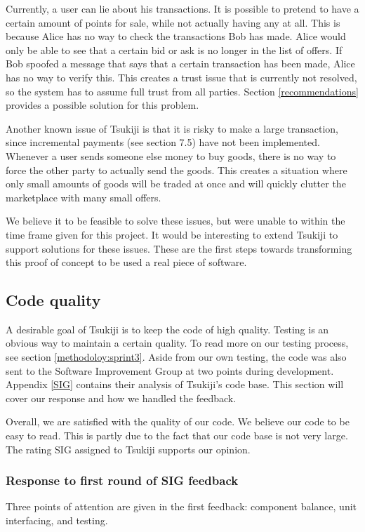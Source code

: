 Currently, a user can lie about his transactions.
It is possible to pretend to have a certain amount of points for sale, while not actually having any at all.
This is because Alice has no way to check the transactions Bob has made.
Alice would only be able to see that a certain bid or ask is no longer in the list of offers.
If Bob spoofed a message that says that a certain transaction has been made, Alice has no way to verify this.
This creates a trust issue that is currently not resolved, so the system has to assume full trust from all parties.
Section \ref{recommendations} provides a possible solution for this problem.

Another known issue of Tsukiji is that it is risky to make a large transaction, since incremental payments (see section 7.5) have not been implemented.
Whenever a user sends someone else money to buy goods, there is no way to force the other party to actually send the goods.
This creates a situation where only small amounts of goods will be traded at once and will quickly clutter the marketplace with many small offers.

We believe it to be feasible to solve these issues, but were unable to within the time frame given for this project.
It would be interesting to extend Tsukiji to support solutions for these issues.
These are the first steps towards transforming this proof of concept to be used a real piece of software.


\subsection{Code quality}
A desirable goal of Tsukiji is to keep the code of high quality.
Testing is an obvious way to maintain a certain quality.
To read more on our testing process, see section \ref{methodoloy:sprint3}.
Aside from our own testing, the code was also sent to the Software Improvement Group at two points during development.
Appendix \ref{SIG} contains their analysis of Tsukiji's code base.
This section will cover our response and how we handled the feedback.

Overall, we are satisfied with the quality of our code.
We believe our code to be easy to read.
This is partly due to the fact that our code base is not very large.
The rating SIG assigned to Tsukiji supports our opinion.

\subsubsection{Response to first round of SIG feedback}
Three points of attention are given in the first feedback: component balance, unit interfacing, and testing.

